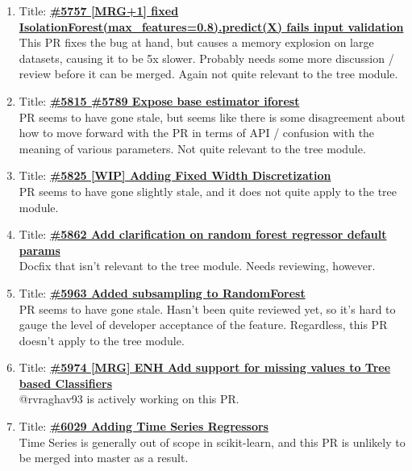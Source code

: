 \documentclass[12pt, oneside]{article}
\begin{document}
\begin{enumerate}
  \item
  Title:
  \textbf{\href{https://github.com/scikit-learn/scikit-learn/pull/5757}
    {\#5757 [MRG+1] fixed IsolationForest(max\_features=0.8).predict(X)
    fails input validation}}\\
  This PR fixes the bug at hand, but causes a memory explosion on
  large datasets, causing it to be 5x slower. Probably needs some more
  discussion / review before it can be merged. Again not quite
  relevant to the tree module.

  \item
  Title:
  \textbf{\href{https://github.com/scikit-learn/scikit-learn/pull/5815}
    {\#5815 \#5789 Expose base estimator iforest}}\\
  PR seems to have gone stale, but seems like there is some
  disagreement about how to move forward with the PR in terms of API /
  confusion with the meaning of various parameters. Not quite relevant
  to the tree module.

  \item
  Title:
  \textbf{\href{https://github.com/scikit-learn/scikit-learn/pull/5825}
    {\#5825 [WIP] Adding Fixed Width Discretization}}\\
  PR seems to have gone slightly stale, and it does not quite apply to
  the tree module.

  \item
  Title:
  \textbf{\href{https://github.com/scikit-learn/scikit-learn/pull/5862}
    {\#5862 Add clarification on random forest regressor default params}}\\
  Docfix that isn't relevant to the tree module. Needs reviewing,
  however.

  \item
  Title:
  \textbf{\href{https://github.com/scikit-learn/scikit-learn/pull/5963}
    {\#5963 Added subsampling to RandomForest}}\\
  PR seems to have gone stale. Hasn't been quite reviewed yet, so it's
  hard to gauge the level of developer acceptance of the
  feature. Regardless, this PR doesn't apply to the tree module.

  \item
  Title:
  \textbf{\href{https://github.com/scikit-learn/scikit-learn/pull/5974}
    {\#5974 [MRG] ENH Add support for missing values to Tree based Classifiers}}\\
  @rvraghav93 is actively working on this PR.

  \item
  Title:
  \textbf{\href{https://github.com/scikit-learn/scikit-learn/pull/6029}
    {\#6029 Adding Time Series Regressors}}\\
  Time Series is generally out of scope in scikit-learn, and this PR
  is unlikely to be merged into master as a result.


\end{enumerate}
\end{document}
